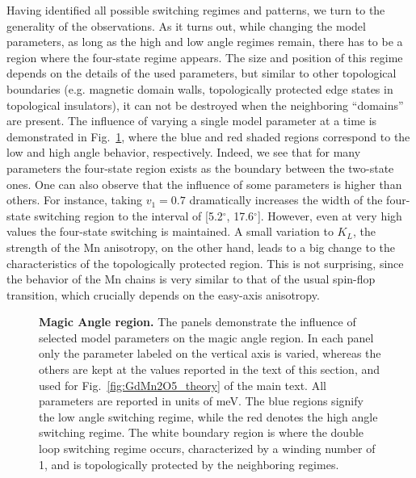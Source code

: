 Having identified all possible switching regimes and patterns, we turn to the generality of the observations. 
As it turns out, while changing the model parameters, as long as the high and low angle regimes remain, there has to be a region where the four-state regime appears. The size and position of this regime depends on the details of the used parameters, but similar to other topological boundaries (e.g. magnetic domain walls, topologically protected edge states in topological insulators), it can not be destroyed when the neighboring ``domains'' are present.
The influence of varying a single model parameter at a time is demonstrated in Fig.~\ref{fig:GdMn2O5_windingvsparam}, where the blue and red shaded regions correspond to the low and high angle behavior, respectively. Indeed, we see that for many parameters the four-state region exists as the boundary between the two-state ones.
One can also observe that the influence of some parameters is higher than others. For instance, taking $v_1=0.7$ dramatically increases the width of the four-state switching region to the interval of [5.2$^\circ$, 17.6$^\circ$]. However, even at very high values the four-state switching is maintained.
A small variation to $K_L$, the strength of the Mn anisotropy, on the other hand, leads to a big change to the characteristics of the topologically protected region.
This is not surprising, since the behavior of the Mn chains is very similar to that of the usual spin-flop transition, which crucially depends on the easy-axis anisotropy.
\begin{figure}[h!]
	\caption{\label{fig:GdMn2O5_windingvsparam} {\bf Magic Angle region.} The panels demonstrate the influence of selected model parameters on the magic angle region. In each panel only the parameter labeled on the vertical axis is varied, whereas the others are kept at the values reported in the text of this section, and used for Fig.~\ref{fig:GdMn2O5_theory} of the main text. All parameters are reported in units of meV. The blue regions signify the low angle switching regime, while the red denotes the high angle switching regime. The white boundary region is where the double loop switching regime occurs, characterized by a winding number of 1, and is topologically protected by the neighboring regimes.}
\end{figure}


